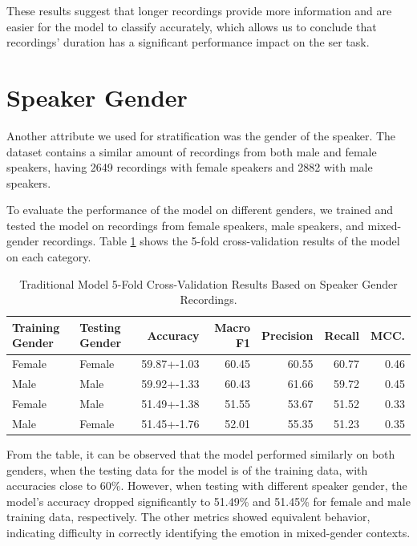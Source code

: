 These results suggest that longer recordings provide more information and are easier for the model to classify accurately, which allows us to conclude that recordings' duration has a significant performance impact on the \ac{ser} task.

\section{Speaker Gender}

Another attribute we used for stratification was the gender of the speaker. The dataset contains a similar amount of recordings from both male and female speakers, having 2649 recordings with female speakers and 2882 with male speakers.

To evaluate the performance of the model on different genders, we trained and tested the model on recordings from female speakers, male speakers, and mixed-gender recordings. Table \ref{5:gender} shows the 5-fold cross-validation results of the model on each category.

\begin{table}[H]
	\centering
	\caption{Traditional Model 5-Fold Cross-Validation Results Based on Speaker Gender Recordings.}
	\label{5:gender}
	\begin{tabular}{llrrrrr}
		\toprule
		Training Gender & Testing Gender & Accuracy    &   Macro F1 &   Precision &   Recall &   MCC. \\
		\midrule
		Female	& Female & 59.87+-1.03 & 60.45 & 60.55 & 60.77 & 0.46 \\
		Male 	& Male	 & 59.92+-1.33 & 60.43 & 61.66 & 59.72 & 0.45 \\
		Female  & Male	 & 51.49+-1.38 & 51.55 & 53.67 & 51.52 & 0.33 \\
		Male    & Female & 51.45+-1.76 & 52.01 & 55.35 & 51.23 & 0.35 \\
		\bottomrule
	\end{tabular}
\end{table}

From the table, it can be observed that the model performed similarly on both genders, when the testing data for the model is of the training data, with accuracies close to 60\%. However, when testing with different speaker gender, the model's accuracy dropped significantly to 51.49\% and 51.45\% for female and male training data, respectively. The other metrics showed equivalent behavior, indicating difficulty in correctly identifying the emotion in mixed-gender contexts.


